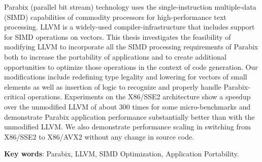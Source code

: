 
%
%


Parabix (parallel bit stream) technology uses the single-instruction multiple-data (SIMD) capabilities of commodity processors for high-performance text processing. LLVM is a widely-used compiler-infrastructure that includes support for SIMD operations on vectors. This thesis investigates the feasibility of modifying LLVM to incorporate all the SIMD processing requirements of Parabix both to increase the portability of applications and to create additional opportunities to optimize those operations in the context of code generation. Our modifications include redefining type legality and lowering for vectors of small elements as well as insertion of logic to recognize and properly handle Parabix-critical operations. Experiments on the X86/SSE2 architecture show a speedup over the unmodified LLVM of about 300 times for some micro-benchmarks and demonstrate Parabix application performance substantially better than with the unmodified LLVM\@. We also demonstrate performance scaling in switching from X86/SSE2 to X86/AVX2 without any change in source code.

\textbf{Key words}: Parabix, LLVM, SIMD Optimization, Application Portability.
